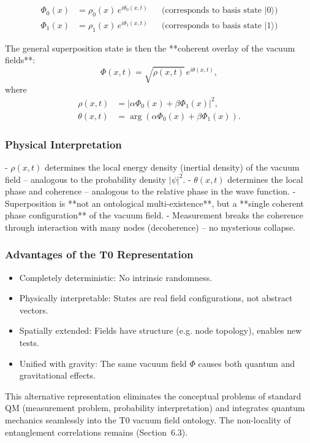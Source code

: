 	\begin{align}
		\Phi_0(x) &= \rho_0(x) \, e^{i \theta_0(x,t)} && \text{(corresponds to basis state } |0\rangle\text{)} \\
		\Phi_1(x) &= \rho_1(x) \, e^{i \theta_1(x,t)} && \text{(corresponds to basis state } |1\rangle\text{)}
	\end{align}
	
	The general superposition state is then the **coherent overlay of the vacuum fields**:
	\[
	\Phi(x,t) = \sqrt{\rho(x,t)} \, e^{i \theta(x,t)},
	\]
	where
	\begin{align}
		\rho(x,t) &= |\alpha \Phi_0(x) + \beta \Phi_1(x)|^2, \\
		\theta(x,t) &= \arg(\alpha \Phi_0(x) + \beta \Phi_1(x)).
	\end{align}
	
	\subsubsection{Physical Interpretation}
	
	- $\rho(x,t)$ determines the local energy density (inertial density) of the vacuum field – analogous to the probability density $|\psi|^2$.
	- $\theta(x,t)$ determines the local phase and coherence – analogous to the relative phase in the wave function.
	- Superposition is **not an ontological multi-existence**, but a **single coherent phase configuration** of the vacuum field.
	- Measurement breaks the coherence through interaction with many nodes (decoherence) – no mysterious collapse.
	
	\subsubsection{Advantages of the T0 Representation}
	
	\begin{itemize}
		\item Completely deterministic: No intrinsic randomness.
		\item Physically interpretable: States are real field configurations, not abstract vectors.
		\item Spatially extended: Fields have structure (e.g. node topology), enables new tests.
		\item Unified with gravity: The same vacuum field $\Phi$ causes both quantum and gravitational effects.
	\end{itemize}
	
	This alternative representation eliminates the conceptual problems of standard QM (measurement problem, probability interpretation) and integrates quantum mechanics seamlessly into the T0 vacuum field ontology. The non-locality of entanglement correlations remains (Section~6.3).
	
